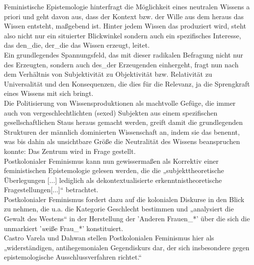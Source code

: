 \noindent Feministische Epistemologie hinterfragt die Möglichkeit eines neutralen Wissens
a priori und geht davon aus, dass der Kontext bzw. der Wille aus dem heraus das
Wissen entsteht, maßgebend ist. Hinter jedem Wissen das produziert wird, steht
also nicht nur ein situierter Blickwinkel sondern auch ein spezifisches
Interesse, das den\_die, der\_die das Wissen erzeugt, leitet.\\
 Ein grundlegendes
Spannungsfeld, das mit dieser radikalen Befragung nicht nur des Erzeugten,
sondern auch des\_der Erzeugenden einhergeht, fragt nun nach dem Verhältnis von
Subjektivität zu Objektivität bzw. Relativität zu Universalität und den
Konsequenzen, die dies für die Relevanz, ja die Sprengkraft eines Wissens mit
sich bringt.\footnotemark {} \\
Die Politisierung von Wissensproduktionen als machtvolle Gefüge,
die immer auch von vergeschlechtlichten (sexed) Subjekten aus einem
spezifischen gesellschaftlichen Staus heraus gemacht werden, greift damit die
grundlegenden Strukturen der männlich dominierten Wissenschaft an, indem sie
das benennt, was bis dahin als unsichtbare Größe die Neutralität des Wissens
beanspruchen konnte: Das Zentrum wird in Frage gestellt.\footnotemark
{}\\

\noindent Postkolonialer Feminismus kann nun gewissermaßen als Korrektiv einer
feministischen Epistemologie gelesen werden, die die „subjekttheoretische
Überlegungen [...] lediglich als dekontextualisierte erkenntnistheoretische
Fragestellungen[...]“ \footnotemark {} betrachtet. \\
Postkolonialer Feminismus fordert dazu auf die kolonialen
Diskurse in den Blick zu nehmen, die u.a. die Kategorie Geschlecht bestimmen
und „analysiert die Gewalt des Westens“ \footnotemark
{} in der Herstellung der 'Anderen
Frauen\_*' über die sich die unmarkiert '\textit{w}eiße Frau\_*' konstituiert.\\
Castro Varela und Dahwan stellen Postkolonialen Feminismus hier als
„widerständigen, antihegemonialen Gegendiskurs dar, der sich insbesondere gegen
epistemologische Ausschlussverfahren richtet.“ \footnotemark
{}\\

